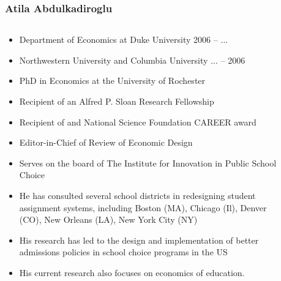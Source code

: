 \documentclass[10pt,pdf,hyperref={unicode}]{beamer}
\begin{document}
\begin{frame}
    \frametitle{Atila Abdulkadiroglu}
    \begin{columns}
        \begin{column}{.5\textwidth}
            \scriptsize{
            \begin{itemize}
                \item Department of Economics at Duke University 2006 -- $\dots$
                \item Northwestern University and Columbia University $\dots$ -- 2006
                \item PhD in Economics at the University of Rochester
                \item Recipient of an Alfred P. Sloan Research Fellowship
                \item Recipient of and National Science Foundation CAREER award
                \item Editor-in-Chief of Review of Economic Design
                \item Serves on the board of The Institute for Innovation in Public School Choice
                \item He has consulted several school districts in redesigning student assignment systems, including Boston (MA), Chicago (Il), Denver (CO), New Orleans (LA), New York City (NY)
                \item His research has led to the design and implementation of better admissions policies in school choice programs in the US
                \item His current research also focuses on economics of education.
            \end{itemize}
            }
        \end{column}
        \begin{column}{.5\textwidth}
            \begin{figure}[H]
                \noindent{}
            \end{figure}
        \end{column}
    \end{columns}
\end{frame}
\end{document}
